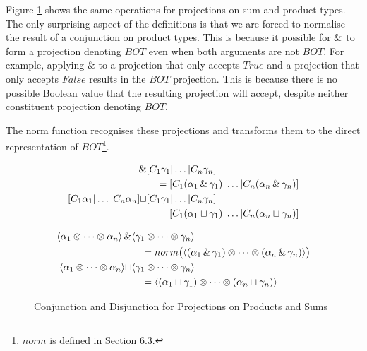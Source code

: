 Figure \ref{fig:conjDisSum} shows the same operations for projections on sum
and product types. The only surprising aspect of the definitions is that we are
forced to normalise the result of a conjunction on product types. This is
because it possible for $\operatorname{\&}$ to form a projection denoting $BOT$ even when
both arguments are not $BOT$. For example, applying $\&$ to a projection that
only accepts $True$ and a projection that only accepts $False$ results in the
$BOT$ projection. This is because there is no possible Boolean value that the
resulting projection will accept, despite neither constituent projection
denoting $BOT$.

The \<norm\> function recognises these projections and transforms them to the
direct representation of $BOT$\footnote{$norm$ is defined in
\cite{hinze1995projection} Section 6.3.}.

\begin{figure}
\noindent

\begin{align*}
[C_{1} \alpha_{1} | \dots | C_{n} \alpha_{n}] \pmeet& [C_{1} \gamma_{1} | \dots | C_{n} \gamma_{n}] \\
    & \quad = [C_{1} (\alpha_{1} \pmeet \gamma_{1}) | \dots | C_{n} (\alpha_{n} \pmeet \gamma_{n})] \\
[C_{1} \alpha_{1} | \dots | C_{n} \alpha_{n}] \sqcup& [C_{1} \gamma_{1} | \dots | C_{n} \gamma_{n}] \\
    & \quad = [C_{1} (\alpha_{1} \sqcup \gamma_{1}) | \dots | C_{n} (\alpha_{n} \sqcup \gamma_{n})]
\end{align*}%

\begin{align*}
\langle \alpha_{1} \otimes \dots \otimes \alpha_{n} \rangle \operatorname{\&}& \langle \gamma_{1} \otimes \dots \otimes \gamma_{n} \rangle \\
    & \quad = norm \big( \langle (\alpha_{1} \operatorname{\&} \gamma_{1}) \otimes \dots \otimes (\alpha_{n} \operatorname{\&} \gamma_{n})\rangle \big) \\
\langle \alpha_{1} \otimes \dots \otimes \alpha_{n} \rangle \sqcup& \langle \gamma_{1} \otimes \dots \otimes \gamma_{n} \rangle \\
    & \quad = \langle (\alpha_{1} \sqcup \gamma_{1}) \otimes \dots \otimes (\alpha_{n} \sqcup \gamma_{n})\rangle
\end{align*}
\caption[Conjunction and Disjunction for Projections 2]{Conjunction and Disjunction for Projections on Products and Sums}
\label{fig:conjDisSum}
\end{figure}

